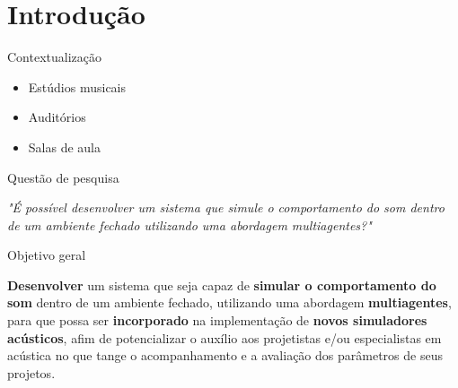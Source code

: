 \section{Introdução}

\begin{frame}{Contextualização}
  \begin{itemize}
  	\item Estúdios musicais
  	\linebreak
  	\item Auditórios
	\linebreak
  	\item Salas de aula
  \end{itemize}
  
\end{frame}
\begin{frame}{Questão de pesquisa}

	\begin{center}
		\textit{"É possível desenvolver um sistema que simule o comportamento do som dentro de um ambiente fechado utilizando uma abordagem multiagentes?"}
	\end{center}

\end{frame}
\begin{frame}{Objetivo geral}

\textbf{Desenvolver} um sistema que seja capaz de \textbf{simular o comportamento do som} dentro de um ambiente fechado, utilizando uma abordagem \textbf{multiagentes}, para que possa ser \textbf{incorporado} na implementação de \textbf{novos simuladores acústicos}, afim de potencializar o auxílio aos projetistas e/ou especialistas em acústica no que tange o acompanhamento e a avaliação dos parâmetros de seus projetos.

\end{frame}
